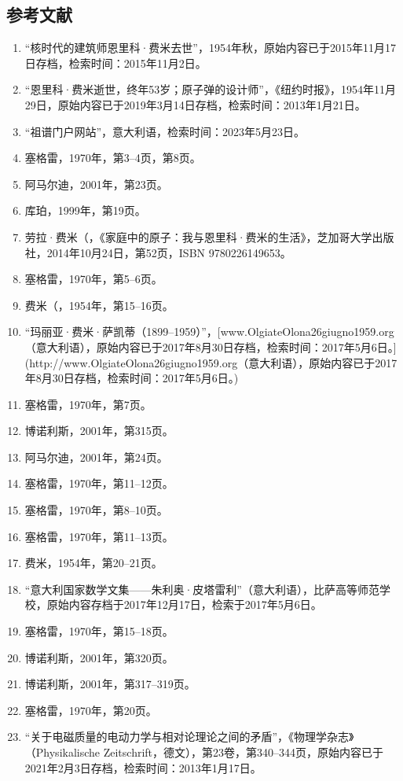 \subsection{参考文献}
\begin{enumerate}
\item “核时代的建筑师恩里科·费米去世”，1954年秋，原始内容已于2015年11月17日存档，检索时间：2015年11月2日。
\item “恩里科·费米逝世，终年53岁；原子弹的设计师”，《纽约时报》，1954年11月29日，原始内容已于2019年3月14日存档，检索时间：2013年1月21日。
\item “祖谱门户网站”，意大利语，检索时间：2023年5月23日。
\item 塞格雷，1970年，第3–4页，第8页。
\item 阿马尔迪，2001年，第23页。
\item 库珀，1999年，第19页。
\item 劳拉·费米（，《家庭中的原子：我与恩里科·费米的生活》，芝加哥大学出版社，2014年10月24日，第52页，ISBN 9780226149653。
\item 塞格雷，1970年，第5–6页。
\item 费米（，1954年，第15–16页。
\item “玛丽亚·费米·萨凯蒂（1899–1959）”，[www.OlgiateOlona26giugno1959.org（意大利语），原始内容已于2017年8月30日存档，检索时间：2017年5月6日。](http://www.OlgiateOlona26giugno1959.org（意大利语），原始内容已于2017年8月30日存档，检索时间：2017年5月6日。)
\item 塞格雷，1970年，第7页。
\item 博诺利斯，2001年，第315页。
\item 阿马尔迪，2001年，第24页。
\item 塞格雷，1970年，第11–12页。
\item 塞格雷，1970年，第8–10页。
\item 塞格雷，1970年，第11–13页。
\item 费米，1954年，第20–21页。
\item “意大利国家数学文集——朱利奥·皮塔雷利”（意大利语），比萨高等师范学校，原始内容存档于2017年12月17日，检索于2017年5月6日。
\item 塞格雷，1970年，第15–18页。
\item 博诺利斯，2001年，第320页。
\item 博诺利斯，2001年，第317–319页。
\item 塞格雷，1970年，第20页。
\item “关于电磁质量的电动力学与相对论理论之间的矛盾”，《物理学杂志》（Physikalische Zeitschrift，德文），第23卷，第340–344页，原始内容已于2021年2月3日存档，检索时间：2013年1月17日。

\end{enumerate}

